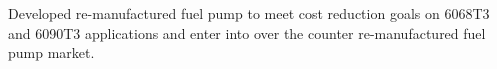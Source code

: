 \runsubsection{\textcolor{JDgreen}{John Deere JDPS}}
\begin{minipage}{1\textwidth\vspace{2pt}}
\textcolor{JDgreen}{\mybar}\faAngleRight Developed re-manufactured fuel pump to meet cost reduction goals on 6068T3\\
\textcolor{JDgreen}{\mybar}\textcolor{invisible}{\faAngleRight}and 6090T3 applications and enter into over the counter re-manufactured fuel\\
\textcolor{JDgreen}{\mybar}\textcolor{invisible}{\faAngleRight}pump market.
\end{minipage}

\sectionsep